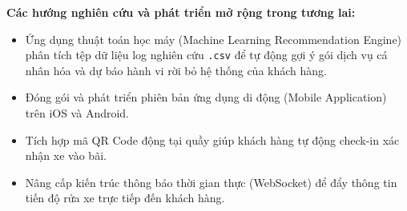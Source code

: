 \noindent \textbf{Các hướng nghiên cứu và phát triển mở rộng trong tương lai:}
\begin{itemize}
    \item Ứng dụng thuật toán học máy (Machine Learning Recommendation Engine) phân tích tệp dữ liệu log nghiên cứu \texttt{.csv} để tự động gợi ý gói dịch vụ cá nhân hóa và dự báo hành vi rời bỏ hệ thống của khách hàng.
    \item Đóng gói và phát triển phiên bản ứng dụng di động (Mobile Application) trên iOS và Android.
    \item Tích hợp mã QR Code động tại quầy giúp khách hàng tự động check-in xác nhận xe vào bãi.
    \item Nâng cấp kiến trúc thông báo thời gian thực (WebSocket) để đẩy thông tin tiến độ rửa xe trực tiếp đến khách hàng.
\end{itemize}
